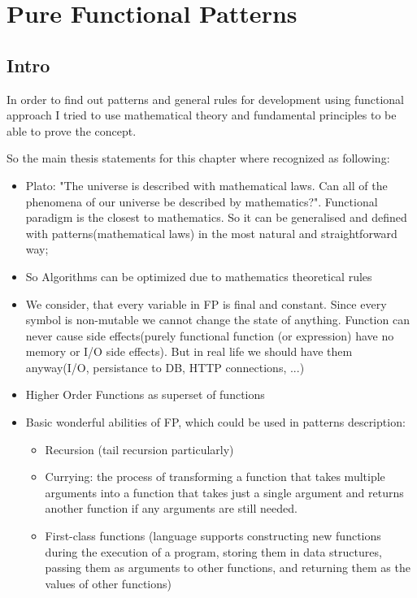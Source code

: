 \chapter{Pure Functional Patterns}
\label{chap:functional_patterns}

\section{Intro}

In order to find out patterns and general rules for development using functional approach I tried to use mathematical theory and fundamental principles to be able to prove the concept.

So the main thesis statements for this chapter where recognized as following:

\begin{itemize}
	\item Plato: "The universe is described with mathematical laws. Can all of the phenomena of our universe be described by mathematics?". Functional paradigm is the closest to mathematics. So it can be generalised and defined with patterns(mathematical laws) in the most natural and straightforward way;
	\item So Algorithms can be optimized due to mathematics theoretical rules
	\item We consider, that every variable in FP is final and constant. Since every symbol is non-mutable we cannot change the state of anything. Function can never cause side effects(purely functional function (or expression) have no memory or I/O side effects). But in real life we should have them anyway(I/O, persistance to DB, HTTP connections, ...)
	\item Higher Order Functions as superset of functions
	\item Basic wonderful abilities of FP, which could be used in patterns description:
	\begin{itemize}
		\item Recursion (tail recursion particularly)
		\item Currying: the process of transforming a function that takes multiple arguments into a function that takes just a single argument and returns another function if any arguments are still needed.
		\item First-class functions (language supports constructing new functions during the execution of a program, storing them in data structures, passing them as arguments to other functions, and returning them as the values of other functions)

\end{itemize}
\end{itemize}
